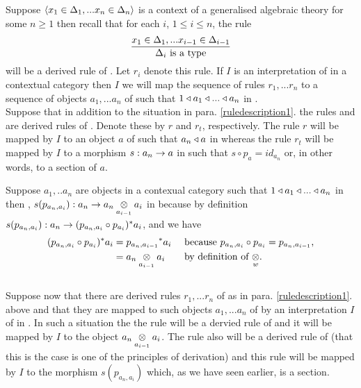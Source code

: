 \note
\label{ruledescription1}
Suppose $\encxDelta{n}$ is a context of a generalised algebraic theory \gatUw for some $n \ge 1$
then recall that for each $i$, 
$1 \leq i \leq n$, the rule $$\frac{\xDelta{i-1}}{\isT{\Delta_i}}$$ will be a derived rule of \gatU. Let $r_i$ denote this rule.
If $I$ is an interpretation of \gatUw in a contextual category \catcw then  $I$ we will map the sequence of rules
$r_1, ... r_n$ to a sequence of objects $a_1,...a_n$ of \catcw such that
$1 \base a_1 \base ... \base a_n$ in \catc. \\
\note Suppose that in addition to the situation in para. \ref{ruledescription1}. the rules
 and 
 are derived rules of \gatUw. Denote these by $r$ and $r_t$, respectively.
The rule $r$ will be mapped by $I$ to an object $a$ of \catcw such that $a_n \base a$ in \catcw whereas the rule
$r_t$ will be mapped by $I$ to a morphism $s:a_n \morph a$ in \gatUw such that $s \circ p_a = id_{a_n}$ or, in other words, to a section of $a$. \\
\begin{minipage}[t]{13cm}
\note Suppose $a_1,..a_n$ are objects in a contexual category \catcw such that $1 \base a_1 \base ... \base a_n$ in \catcw then \foreachi,
$s(p_{a_n,a_i}): a_n \morph \crossx{a_n}{a_i}{a_{i-1}}$ in \catcw because by definition  $s(p_{a_n,a_i}): a_n  \morph (p_{a_n,a_i} \circ p_{a_i})^*a_i$,
and we have 
\begin{align*}
(p_{a_n,a_i} \circ p_{a_i})^*a_i &= {p_{a_n,a_{i-1}}} ^* a_i  && \mbox{ because $p_{a_n,a_i} \circ p_{a_i}=p_{a_n,a_{i-1}}$,} \\
                                 &= \crossx{a_n}{a_i}{a_{i-1}} && \mbox{ by definition of $\crossx{}{}{w}$}.
\end{align*} \\
Suppose now that there are derived rules $r_1,...r_n$ of \gatUw as in para. \ref{ruledescription1}. above and that they are mapped to such objects $a_1, ...a_n$ of \catcw by an interpretation $I$ of \gatUw in \catc. In such a situation the
 the rule 
 will be a dervied rule of \gatUw and   it will be mapped by $I$ to the object 
$\crossx{a_n}{a_i}{a_{i-1}}$.
The rule
 also will be a derived rule of \gatUw (that this is the case is one of the principles of derivation)
and  this rule will be mapped by $I$ to the morphism
$s(p_{a_n,a_i})$ which, as we have seen earlier, is a section.
\end{minipage}
